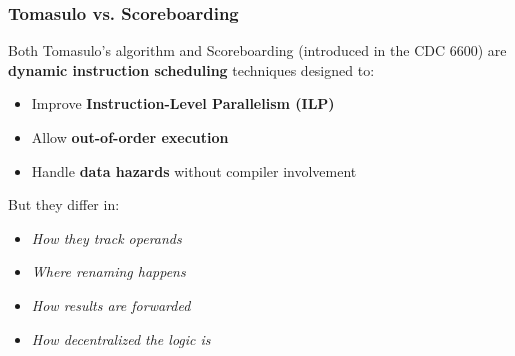 \subsubsection{Tomasulo vs. Scoreboarding}

Both Tomasulo's algorithm and Scoreboarding (introduced in the CDC 6600) are \textbf{dynamic instruction scheduling} techniques designed to:
\begin{itemize}
    \item Improve \textbf{Instruction-Level Parallelism (ILP)}
    \item Allow \textbf{out-of-order execution}
    \item Handle \textbf{data hazards} without compiler involvement
\end{itemize}
But they differ in:
\begin{itemize}
    \item \emph{How they track operands}
    \item \emph{Where renaming happens}
    \item \emph{How results are forwarded}
    \item \emph{How decentralized the logic is}
\end{itemize}

